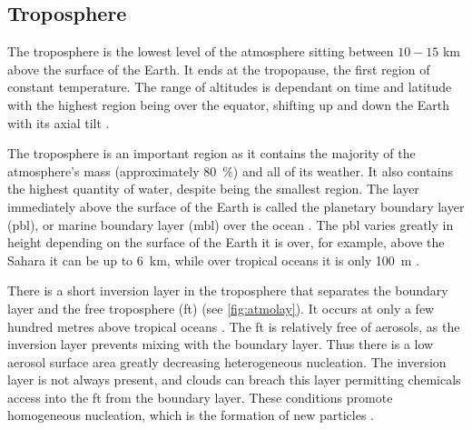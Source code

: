 \subsection{Troposphere}
\label{subsec:trop}
The troposphere is the lowest level of the atmosphere sitting between $10-15$ \si{\km} above the surface of the Earth. It ends at the tropopause, the first region of constant temperature. The range of altitudes is dependant on time and latitude with the highest region being over the equator, shifting up and down the Earth with its axial tilt \citep[Chapter 1]{seinfeld2012atmospheric}.

The troposphere is an important region as it contains the majority of the atmosphere's mass (approximately \SI{80}{\percent}) and all of its weather. It also contains the highest quantity of water, despite being the smallest region. The layer immediately above the surface of the Earth is called the planetary boundary layer (\gls{pbl}), or marine boundary layer (\gls{mbl}) over the ocean \citep[Chapter 1]{seinfeld2012atmospheric}. The \gls{pbl} varies greatly in height depending on the surface of the Earth it is over, for example, above the Sahara it can be up to \SI{6}{\kilo\meter}, while over tropical oceans it is only \SI{100}{\meter} \citep[Chapter 1]{laing2011introduction}.

There is a short inversion layer in the troposphere that separates the boundary layer and the free troposphere (\gls{ft}) (see \cref{fig:atmolay}). It occurs at only a few hundred metres above tropical oceans \citep{laing2011introduction}. The \gls{ft} is relatively free of aerosols, as the inversion layer prevents mixing with the boundary layer. Thus there is a low aerosol surface area greatly decreasing heterogeneous nucleation. The inversion layer is not always present, and clouds can breach this layer permitting chemicals access into the \gls{ft} from the boundary layer. These conditions promote homogeneous nucleation, which is the formation of new particles \citep[Chapter 8]{seinfeld2012atmospheric}.

